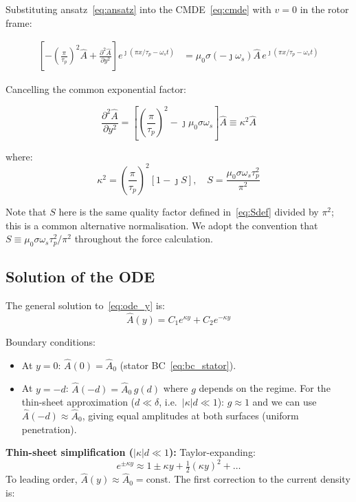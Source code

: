 \documentclass[12pt, a4paper]{article}
\theoremstyle{plain}
\theoremstyle{definition}
\newcommand{\taup}{\tau_p}
\newcommand{\oms}{\omega_s}
\newcommand{\sig}{\sigma}
\newcommand{\muZ}{\mu_0}
\newcommand{\DDer}[2]{\frac{\partial^2 #1}{\partial #2^2}}
\begin{document}
Substituting ansatz~\eqref{eq:ansatz} into the CMDE~\eqref{eq:cmde} with $v=0$
in the rotor frame:

\begin{align}
  \left[-\left(\frac{\pi}{\taup}\right)^2 \hat{A} + \DDer{\hat{A}}{y}\right]
  e^{\jmath(\pi x/\taup - \oms t)}
  &= \muZ\sig(-\jmath\oms)\hat{A}\,
     e^{\jmath(\pi x/\taup - \oms t)}
\end{align}

Cancelling the common exponential factor:

\begin{equation}
  \DDer{\hat{A}}{y} = \left[\left(\frac{\pi}{\taup}\right)^2 - \jmath\muZ\sig\oms\right]\hat{A}
  \equiv \kappa^2\hat{A}
  \label{eq:ode_y}
\end{equation}

where:
\begin{equation}
  \kappa^2 = \left(\frac{\pi}{\taup}\right)^2\left[1 - \jmath S\right],
  \quad S = \frac{\muZ\sig\oms\taup^2}{\pi^2}
  \label{eq:kappa}
\end{equation}

Note that $S$ here is the same quality factor defined in~\eqref{eq:Sdef} divided by
$\pi^2$; this is a common alternative normalisation. We adopt the convention that
$S \equiv \muZ\sig\oms\taup^2/\pi^2$ throughout the force calculation.

\subsection{Solution of the ODE}

The general solution to~\eqref{eq:ode_y} is:
\begin{equation}
  \hat{A}(y) = C_1 e^{\kappa y} + C_2 e^{-\kappa y}
\end{equation}

Boundary conditions:
\begin{itemize}
  \item At $y = 0$: $\hat{A}(0) = \hat{A}_0$ (stator BC~\eqref{eq:bc_stator}).
  \item At $y = -d$: $\hat{A}(-d) = \hat{A}_0\,g(d)$ where $g$ depends on the
        regime. For the thin-sheet approximation ($d \ll \delta$, i.e.\ $|\kappa|d \ll 1$):
        $g \approx 1$ and we can use $\hat{A}(-d) \approx \hat{A}_0$, giving
        equal amplitudes at both surfaces (uniform penetration).
\end{itemize}

\noindent\textbf{Thin-sheet simplification ($|\kappa|d \ll 1$):} Taylor-expanding:
\begin{equation}
  e^{\pm\kappa y} \approx 1 \pm \kappa y + \tfrac{1}{2}(\kappa y)^2 + \ldots
\end{equation}
To leading order, $\hat{A}(y) \approx \hat{A}_0 = \text{const}$. The first
correction to the current density is:
\end{document}
